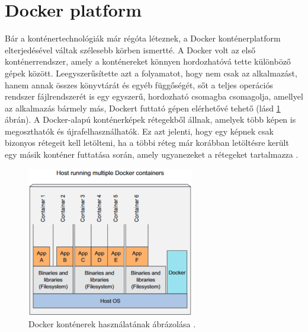 \section{Docker platform}
Bár a konténertechnológiák már régóta léteznek, a Docker konténerplatform elterjedésével váltak szélesebb körben ismertté.
A Docker volt az első konténerrendszer, amely a konténereket könnyen hordozhatóvá tette különböző gépek között.
Leegyszerűsítette azt a folyamatot, hogy nem csak az alkalmazást, hanem annak összes könyvtárát és egyéb függőségét, sőt a teljes operációs rendszer fájlrendszerét is egy egyszerű, hordozható csomagba csomagolja, amellyel az alkalmazás bármely más, Dockert futtató gépen elérhetővé tehető (lásd \ref{running-containers} ábrán).
A Docker-alapú konténerképek rétegekből állnak, amelyek több képen is megoszthatók és újrafelhasználhatók.
Ez azt jelenti, hogy egy képnek csak bizonyos rétegeit kell letölteni, ha a többi réteg már korábban letöltésre került egy másik konténer futtatása során, amely ugyanezeket a rétegeket tartalmazza \cite{Marko17}.

\begin{figure}[ht]
    \centering
         \includegraphics[width=0.65\textwidth]{figures/docker/running-contaiers.png}
          \caption{Docker konténerek használatának ábrázolása \cite{Marko17}.}
           \label{running-containers}
\end{figure}